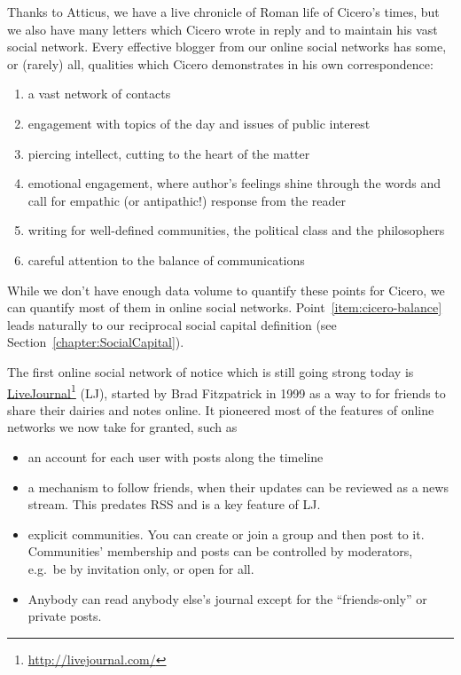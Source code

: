 \documentclass[10pt,oneside]{memoir}
\begin{document}
Thanks to Atticus, we have a live chronicle of Roman life of Cicero's times, but we also have many letters which Cicero wrote in reply and to maintain his vast social network. Every effective blogger from our online social networks has some, or (rarely) all, qualities which Cicero demonstrates in his own correspondence:


\begin{enumerate}


\item a vast network of contacts

\item engagement with topics of the day and issues of public interest

\item piercing intellect, cutting to the heart of the matter

\item emotional engagement, where author's feelings shine through the words and call for empathic (or antipathic!) response from the reader

\item writing for well-defined communities, the political class and the philosophers

\item \label{item:cicero-balance} careful attention to the balance of communications
\end{enumerate}

While we don't have enough data volume to quantify these points for Cicero, we can quantify most of them in online social networks.  Point~\ref{item:cicero-balance} leads naturally to our reciprocal social capital definition (see Section~\ref{chapter:SocialCapital}).


The first online social network of notice which is still going strong today is \href{http://livejournal.com/}{LiveJournal}\footnote{\href{http://livejournal.com/}{http://livejournal.com/}} (LJ), started by Brad Fitzpatrick in 1999 as a way to for friends to share their dairies and notes online.  It pioneered most of the features of online networks we now take for granted, such as


\begin{itemize}


\item an account for each user with posts along the timeline

\item a mechanism to follow friends, when their updates can be reviewed as a news stream. This predates RSS and is a key feature of LJ.

\item explicit communities. You can create or join a group and then post to it. Communities' membership and posts can be controlled by moderators, e.g.\ be by invitation only, or open for all.

\item Anybody can read anybody else's journal except for the ``friends-only'' or private posts.
\end{itemize}
\end{document}
